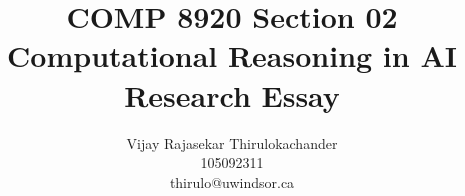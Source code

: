 \documentclass[UTF8]{article}
\begin{document}
    \title{COMP 8920 Section 02\\ Computational Reasoning in AI \\Research Essay}
    \author{
        Vijay Rajasekar Thirulokachander \\
        \large 105092311 \\
        \large thirulo@uwindsor.ca
    }
    \maketitle
    \date{}
\end{document}
